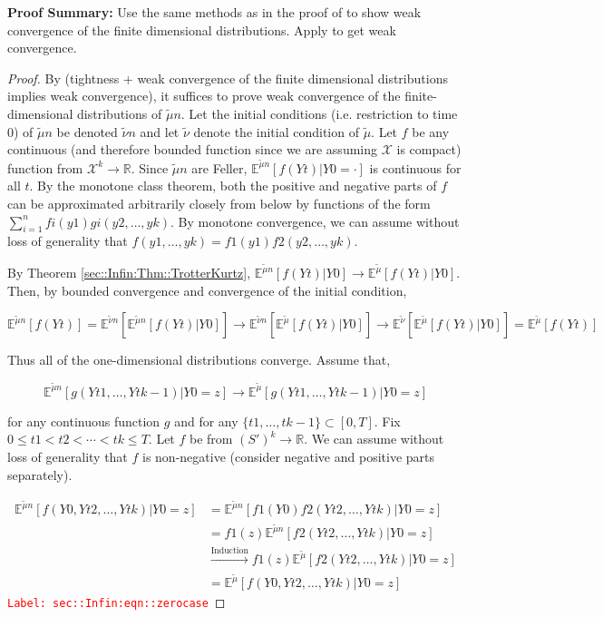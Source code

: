 \documentclass[12pt]{article}
\newcommand{\mb}{\mathbb}
\newcommand{\mc}{\mathcal}
\newcommand{\ra}{\rightarrow}
\newcommand{\os}{\overset}
\newcommand{\te}{\text}
\newcommand{\tr}{\textcolor{red}}
\newcommand{\labe}[1]{\tr{\texttt{Label: #1}}}
\newcommand{\pfsum}{\textbf{Proof Summary: }}
\newcommand{\ind}{\hspace{24pt}}
\newcommand{\exmu}[2]{\mb{E}^{#1}\left[#2\right]}	%
\renewcommand{\t}{t}							%
\newcommand{\alt}[1]{\widetilde{#1}}			%
\newcommand{\m}{\mu}							%
\newcommand{\mm}{\nu}							%
\newcommand{\XX}{Y}								%
\renewcommand{\it}{k}							%
\newcommand{\spce}{\mc{X}}						%
\newcommand{\xx}{y}								%
\newcommand{\xxx}{z}							%
\begin{document}
\pfsum Use the same methods as in the proof of \cite[Theorem 4.2]{Kur81} to show weak convergence of the finite dimensional distributions. Apply \cite[Theorem 13.1]{Bil99} to get weak convergence.

\begin{proof}
By \cite[Theorem 13.1]{Bil99} (tightness + weak convergence of the finite dimensional distributions implies weak convergence), it suffices to prove weak convergence of the finite-dimensional distributions of \(\alt{\m}{n}\). Let the initial conditions (i.e. restriction to time 0) of \(\alt{\m}{n}\) be denoted \(\alt{\mm}{n}\) and let \(\alt{\mm}\) denote the initial condition of \(\alt{\m}\). Let \(f\) be any continuous (and therefore bounded function since we are assuming \(\spce\) is compact) function from \(\spce^k\ra\mb{R}\). Since \(\alt{\m}{n}\) are Feller, \(\exmu{\alt{\m}{n}}{f(\XX{}{\t})|\XX{}{0} = \cdot}\) is continuous for all \(\t\). By the monotone class theorem, both the positive and negative parts of \(f\) can be approximated arbitrarily closely from below by functions of the form \(\sum_{i=1}^n f{i}(\xx{1})g{i}(\xx{2},\dots,\xx{\it})\). By monotone convergence, we can assume without loss of generality that \(f(\xx{1},\dots,\xx{\it}) = f{1}(\xx{1})f{2}(\xx{2},\dots,\xx{\it})\).

\ind By Theorem \ref{sec::Infin:Thm::TrotterKurtz}, \(\exmu{\alt{\m}{n}}{f(\XX{}{\t})|\XX{}{0}} \ra \exmu{\alt{\m}}{f(\XX{}{\t})|\XX{}{0}}\). Then, by bounded convergence and convergence of the initial condition,

\[\exmu{\alt{\m}{n}}{f(\XX{}{\t})}  = \exmu{\alt{\mm}{n}}{\exmu{\alt{\m}{n}}{f(\XX{}{\t})|\XX{}{0}}} \ra \exmu{\alt{\mm}{n}}{\exmu{\alt{\m}}{f(\XX{}{\t})|\XX{}{0}}} \ra \exmu{\alt{\mm}}{\exmu{\alt{\m}}{f(\XX{}{\t})|\XX{}{0}}} = \exmu{\alt{\m}}{f(\XX{}{\t})}\]

Thus all of the one-dimensional distributions converge. Assume that,

\[\exmu{\alt{\m}{n}}{g(\XX{}{\t{1}},\dots,\XX{}{\t{k-1}})|\XX{}{0}=\xxx} \ra \exmu{\alt{\m}}{g(\XX{}{\t{1}},\dots,\XX{}{\t{k-1}})|\XX{}{0}=\xxx}\]

\noindent for any continuous function \(g\) and for any \(\{\t{1},\dots,\t{k-1}\} \subset [0,T]\). Fix \(0\leq \t{1} <\t{2} <\cdots < \t{\it}\leq T\). Let \(f\) be from \((S')^k \ra \mb{R}\). We can assume without loss of generality that \(f\) is non-negative (consider negative and positive parts separately).

\begin{align}
\exmu{\alt{\m}{n}}{f(\XX{}{0},\XX{}{\t{2}},\dots,\XX{}{\t{\it}})|\XX{}{0} = \xxx}&= \exmu{\alt{\m}{n}}{f{1}(\XX{}{0})f{2}(\XX{}{\t{2}},\dots,\XX{}{\t{k}})|\XX{}{0}=\xxx}\nonumber\\
&= f{1}(\xxx)\exmu{\alt{\m}{n}}{f{2}(\XX{}{\t{2}},\dots,\XX{}{\t{k}})|\XX{}{0}=\xxx}\nonumber\\
&\os{\te{Induction}}{\ra} f{1}(\xxx)\exmu{\alt{\m}}{f{2}(\XX{}{\t{2}},\dots,\XX{}{\t{k}})|\XX{}{0}=\xxx}\nonumber\\
&= \exmu{\alt{\m}}{f(\XX{}{0},\XX{}{\t{2}},\dots,\XX{}{\t{\it}})|\XX{}{0}=\xxx}
\label{sec::Infin:eqn::zerocase}
\end{align}
\labe{sec::Infin:eqn::zerocase}


\end{proof}
\end{document}
